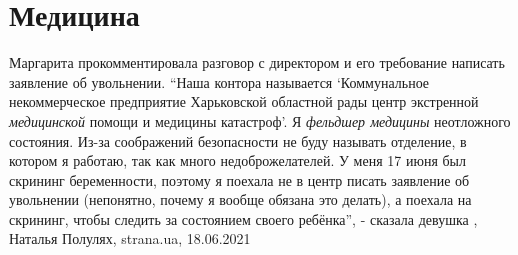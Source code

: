  
 
 
 
 
\chapter{Медицина}

Маргарита прокомментировала разговор с директором и его требование написать
заявление об увольнении.  \enquote{Наша контора называется
\enquote{Коммунальное некоммерческое предприятие Харьковской областной рады
центр экстренной \emph{медицинской} помощи и медицины катастроф}. Я \emph{фельдшер медицины}
неотложного состояния. Из-за соображений безопасности не буду называть
отделение, в котором я работаю, так как много недоброжелателей. У меня 17 июня
был скрининг беременности, поэтому я поехала не в центр писать заявление об
увольнении (непонятно, почему я вообще обязана это делать), а поехала на
скрининг, чтобы следить за состоянием своего ребёнка}, - сказала девушка
,
Наталья Полулях, strana.ua, 18.06.2021

